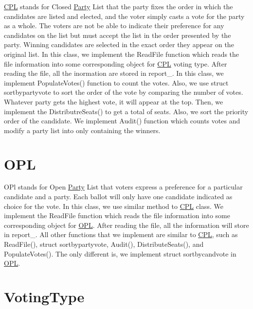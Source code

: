 \hyperlink{classCPL}{C\+PL} stands for Closed \hyperlink{classParty}{Party} List that the party fixes the order in which the candidates are listed and elected, and the voter simply casts a vote for the party as a whole. The voters are not be able to indicate their preference for any candidates on the list but must accept the list in the order presented by the party. Winning candidates are selected in the exact order they appear on the original list. In this class, we implement the Read\+File function which reads the file information into some corresponding object for \hyperlink{classCPL}{C\+PL} voting type. After reading the file, all the inormation are stored in report\+\_\+. In this class, we implement Populate\+Votes() function to count the votes. Also, we use struct sortbypartyvote to sort the order of the vote by comparing the number of votes. Whatever party gets the highest vote, it will appear at the top. Then, we implement the Distributre\+Seats() to get a total of seats. Also, we sort the priority order of the candidate. We implement Audit() function which counts votes and modify a party list into only containing the winners.\hypertarget{index_opl}{}\section{O\+PL}\label{index_opl}
O\+Pl stands for Open \hyperlink{classParty}{Party} List that voters express a preference for a particular candidate and a party. Each ballot will only have one candidate indicated as choice for the vote. In this class, we use similar method to \hyperlink{classCPL}{C\+PL} class. We implement the Read\+File function which reads the file information into some corresponding object for \hyperlink{classOPL}{O\+PL}. After reading the file, all the information will store in report\+\_\+. All other functions that we implement are similar to \hyperlink{classCPL}{C\+PL}, such as Read\+File(), struct sortbypartyvote, Audit(), Distribute\+Seats(), and Populate\+Votes(). The only different is, we implement struct sortbycandvote in \hyperlink{classOPL}{O\+PL}.\hypertarget{index_voting_type}{}\section{Voting\+Type}\label{index_voting_type}
